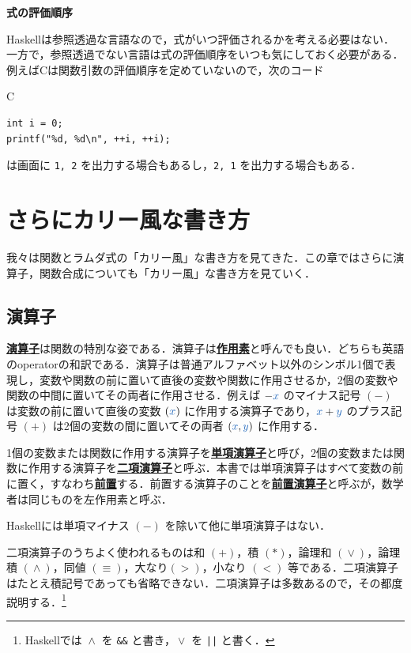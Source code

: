 \documentclass[a5paper,twoside,fleqn,draft]{jsbook}
\def\varColor{NavyBlue}
\newcommand{\programminglanguage}[1]{\textsf{#1}}
\newcommand{\clang}{\programminglanguage{C}}
\newcommand{\haskell}{\programminglanguage{Haskell}}
\newenvironment{leader}{\begingroup\gt}{\endgroup}
\newenvironment{note}[1]{\begin{boxnote}\begin{center}\textbf{#1}\end{center}}{\end{boxnote}}
\newcommand{\keyword}[1]{{\underline{\textbf{#1}}}}
\newcommand{\code}[1]{\texttt{#1}}
\newenvironment{ccode}{\begin{itembox}[r]{\clang}}{\end{itembox}}
\newcommand{\mVar}[1]{\textcolor{\varColor}{#1}}
\newcommand{\mXVar}{\mVar{x}}
\newcommand{\mYVar}{\mVar{y}}
\DeclareMathOperator{\mLogicalAnd}{\wedge}
\DeclareMathOperator{\mLogicalOr}{\vee}
\begin{document}
\begin{note}{式の評価順序}
\haskell は参照透過な言語なので，式がいつ評価されるかを考える必要はない．一方で，参照透過でない言語は式の評価順序をいつも気にしておく必要がある．例えば\clang は関数引数の評価順序を定めていないので，次のコード
\begin{ccode}
\begin{verbatim}
int i = 0;
printf("%d, %d\n", ++i, ++i);
\end{verbatim}
\end{ccode}
は画面に \code{1, 2} を出力する場合もあるし，\code{2, 1} を出力する場合もある．
\end{note}

\chapter{さらにカリー風な書き方}
\label{ch:more-curry}

\begin{leader}
我々は関数とラムダ式の「カリー風」な書き方を見てきた．この章ではさらに演算子，関数合成についても「カリー風」な書き方を見ていく．
\end{leader}

\section{演算子}

\keyword{演算子}は関数の特別な姿である．演算子は\keyword{作用素}と呼んでも良い．どちらも英語のoperatorの和訳である．演算子は普通アルファベット以外のシンボル1個で表現し，変数や関数の前に置いて直後の変数や関数に作用させるか，2個の変数や関数の中間に置いてその両者に作用させる．例えば $-\mXVar$ のマイナス記号 $(-)$ は変数の前に置いて直後の変数 $(\mXVar)$ に作用する演算子であり，$\mXVar+\mYVar$ のプラス記号 $(+)$ は2個の変数の間に置いてその両者 $(\mXVar,\mYVar)$ に作用する．

1個の変数または関数に作用する演算子を\keyword{単項演算子}と呼び，2個の変数または関数に作用する演算子を\keyword{二項演算子}と呼ぶ．本書では単項演算子はすべて変数の前に置く，すなわち\keyword{前置}する．前置する演算子のことを\keyword{前置演算子}と呼ぶが，数学者は同じものを左作用素と呼ぶ．

\haskell には単項マイナス $(-)$ を除いて他に単項演算子はない．

二項演算子のうちよく使われるものは和 $(+)$，積 $(*)$，論理和 $(\mLogicalOr)$，論理積 $(\mLogicalAnd)$，同値 $(\equiv)$，大なり$(>)$，小なり $(<)$ 等である．二項演算子はたとえ積記号であっても省略できない．二項演算子は多数あるので，その都度説明する．\footnote{\haskell では $\mLogicalAnd$ を \code{\&\&} と書き，$\mLogicalOr$ を \code{||} と書く．}
\end{document}
